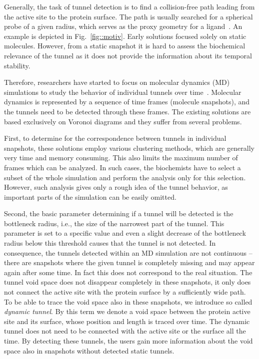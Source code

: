\documentclass[usletter, 10pt, conference]{svjour3}      %
\begin{document}
Generally, the task of tunnel detection is to find a collision-free path leading from the active site to the protein surface. 
The path is usually searched for a spherical probe of a given radius, which serves as the proxy geometry for a ligand~\cite{caver3,sehnal2013mole,kozlikova2014ca}.
An example is depicted in Fig.~\ref{fig::motiv}.
Early solutions focused solely on static molecules. 
However, from a static snapshot it is hard to assess the biochemical relevance of the tunnel as it does not provide the information about its temporal stability. 

Therefore, researchers have started to focus on molecular dynamics (MD) simulations to study the behavior of individual tunnels over time~\cite{yaffe2008,caver3,sehnal2013mole,jurcik2016accelerated}.
Molecular dynamics is represented by a sequence of time frames (molecule snapshots), and the tunnels need to be detected through these frames.
The existing solutions are based exclusively on Voronoi diagrams and they suffer from several problems.

First, to determine for the correspondence between tunnels in individual snapshots, these solutions employ various clustering methods, which are generally very time and memory consuming.
This also limits the maximum number of frames which can be analyzed.
In such cases, the biochemists have to select a subset of the whole simulation and perform the analysis only for this selection.
However, such analysis gives only a rough idea of the tunnel behavior, as important parts of the simulation can be easily omitted.

Second, the basic parameter determining if a tunnel will be detected is the bottleneck radius, i.e., the size of the narrowest part of the tunnel. 
This parameter is set to a specific value and even a slight decrease of the bottleneck radius below this threshold causes that the tunnel is not detected.
In consequence, the tunnels detected within an MD simulation are not continuous -- there are snapshots where the given tunnel is completely missing and may appear again after some time.
In fact this does not correspond to the real situation. 
The tunnel void space does not disappear completely in these snapshots, it only does not connect the active site with the protein surface by a sufficiently wide path.
To be able to trace the void space also in these snapshots, we introduce so called {\it dynamic tunnel}.
By this term we denote a void space between the protein active site and its surface, whose position and length is traced over time.
The dynamic tunnel does not need to be connected with the active site or the surface all the time.
By detecting these tunnels, the users gain more information about the void space also in snapshots without detected static tunnels.
\end{document}
